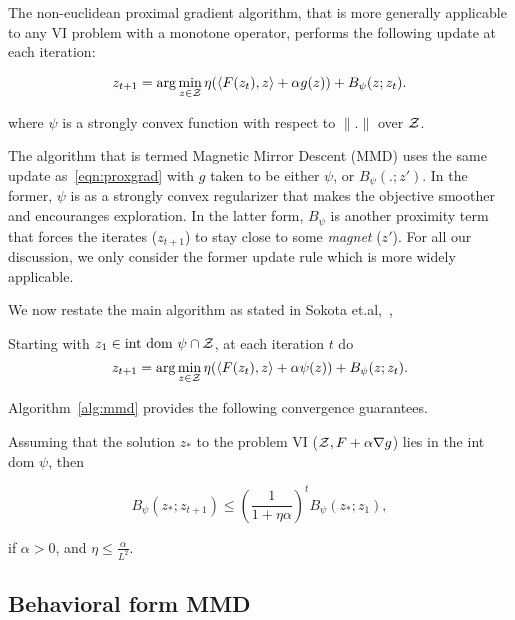 The non-euclidean proximal gradient algorithm, that is more generally applicable to any VI problem
with a monotone operator, performs the following update at each iteration:

\begin{equation}
	\label{eqn:proxgrad} z_{t+1} = \arg \min_{z \in \mathcal{Z}} \eta (\langle F(z_t), z\rangle + \alpha
	g(z)) + B_{\psi} (z; z_t).
\end{equation}

where $\psi$ is a strongly convex function with respect to $\|.\|$ over $\mathcal{Z}$.

The algorithm that is termed Magnetic Mirror Descent (MMD) uses the same update as~\ref{eqn:proxgrad} with $g$ taken to be
either $\psi$, or $B_{\psi}(.;z')$. In the former, $\psi$ is as a strongly convex regularizer that makes the objective smoother and encouranges 
exploration. In the latter form, $B_{\psi}$ is another proximity term that forces the iterates ($z_{t+1}$) to stay close to some  
\textit{magnet} ($z'$). For all our discussion, we only consider the former update rule which is more widely 
applicable.

We now restate the main algorithm as stated in Sokota et.al,~\cite{sokotaUnified2023},

\begin{alprocedure}[H]  \label{alg:mmd} Starting with $z_1 \in \text{int dom } \psi \cap \mathcal{Z}$,
	at each iteration $t$ do $$ z_{t+1} = \arg \min_{z \in \mathcal{Z}} \eta (\langle F(z_t), z\rangle +
		\alpha \psi(z)) + B_{\psi} (z; z_t).
	$$
\end{alprocedure}

\hfill \break
Algorithm~\ref{alg:mmd} provides the following convergence guarantees.
\begin{theorem}
	\label{thm:mmdconv}
	\cite[Theorem 3.4]{sokotaUnified2023}
	Assuming that the solution $z_{\ast}$ to the problem VI ($\mathcal{Z}, F + \alpha \nabla g$) lies in the
	int dom $\psi$, then

	\[ B_{\psi} (z_{\ast}; z_{t + 1}) \leq {\left(\frac{1}{1 +
				\eta \alpha}\right)}^t B_{\psi} (z_{\ast}; z_1), \]

	if $\alpha > 0$, and $\eta
		\leq \frac{\alpha}{L^2}$.
\end{theorem}

\subsection{Behavioral form MMD}


